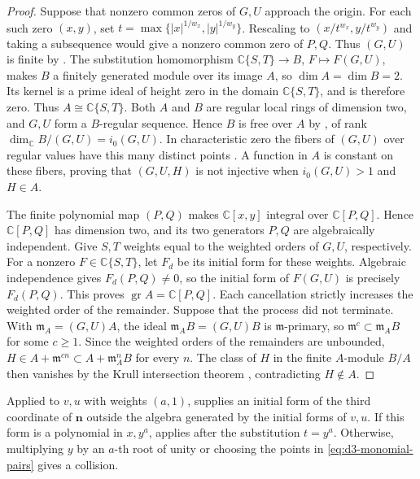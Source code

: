 \documentclass[11pt,letterpaper]{article}
\numberwithin{equation}{section}
\theoremstyle{remark}
\theoremstyle{plain}
\newcommand{\C}{\mathbb{C}}
\begin{document}
\begin{proof}
Suppose that nonzero common zeros of $G,U$ approach the origin.
For each such zero $(x,y)$, set $t=\max\{|x|^{1/w_x},|y|^{1/w_y}\}$.
Rescaling to $(x/t^{w_x},y/t^{w_y})$ and taking a subsequence would
give a nonzero common zero of $P,Q$.  Thus $(G,U)$ is
finite by \cite[Theorem~I.1.66]{GreuelLossenShustin}.
The substitution homomorphism $\C\{S,T\}\to B$, $F\mapsto F(G,U)$,
makes $B$ a finitely generated module over its image $A$, so $\dim A=\dim B=2$.
Its kernel is a prime ideal of height zero in the domain
$\C\{S,T\}$, and is therefore zero.
Thus $A\cong\C\{S,T\}$.  Both $A$ and $B$ are regular local rings
of dimension two, and $G,U$ form a $B$-regular sequence.
Hence $B$ is free over
$A$ by \cite[Theorem~B.8.11 and Proposition~B.3.5]{GreuelLossenShustin},
of rank $\dim_\C B/(G,U)=i_0(G,U)$.  In characteristic zero
the fibers of $(G,U)$ over regular values have this many distinct points
\cite[Theorem~I.1.81(2)]{GreuelLossenShustin}.
A function in $A$ is constant on these fibers, proving that $(G,U,H)$
is not injective when $i_0(G,U)>1$ and $H\in A$.

The finite polynomial map $(P,Q)$ makes $\C[x,y]$ integral over
$\C[P,Q]$.  Hence $\C[P,Q]$ has dimension two, and its two
generators $P,Q$ are algebraically independent.
Give $S,T$ weights equal to the weighted orders of $G,U$,
respectively.  For a nonzero $F\in\C\{S,T\}$, let $F_d$
be its initial form for these weights.  Algebraic independence gives
$F_d(P,Q)\neq0$, so the initial form of $F(G,U)$ is precisely
$F_d(P,Q)$.  This proves $\operatorname{gr}A=\C[P,Q]$.
Each cancellation strictly increases the weighted order of the remainder.
Suppose that the process did not terminate.  With
$\mathfrak m_A=(G,U)A$, the ideal $\mathfrak m_A B=(G,U)B$
is $\mathfrak m$-primary, so
$\mathfrak m^c\subset\mathfrak m_A B$ for some $c\geq1$.
Since the weighted orders of the remainders are unbounded,
$H\in A+\mathfrak m^{cn}\subset A+\mathfrak m_A^nB$ for every
$n$.  The class of $H$ in the finite $A$-module $B/A$
then vanishes by the Krull intersection theorem
\cite[Theorem~B.4.2]{GreuelLossenShustin}, contradicting $H\notin A$.
\end{proof}

Applied to $v,u$ with weights $(a,1)$,  supplies
an initial form of the third coordinate of $\boldsymbol n$ outside the
algebra generated by the initial forms of $v,u$.
If this form is a polynomial in $x,y^a$,
 applies after the substitution $t=y^a$.
Otherwise, multiplying $y$ by an $a$-th root of unity or choosing the
points in \eqref{eq:d3-monomial-pairs} gives a collision.
\end{document}
